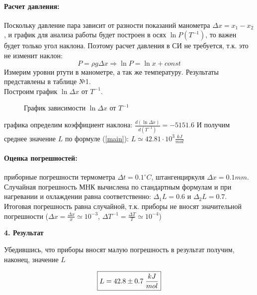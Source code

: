 \documentclass[12pt,a4paper]{article}
\begin{document}
\paragraph{Расчет давления:} Поскольку давление пара зависит от разности показаний манометра $\Delta x = x_{1} -x_{2}$, и график для анализа работы будет построен в осях $\ln P (T^{-1})$, то важен будет только угол наклона. Поэтому расчет давления в СИ не требуется, т.к. это не изменит наклон: \[P = \rho g \Delta x \Rightarrow \ln P = \ln x + const\]
Измерим уровни ртути в манометре, а так же температуру. Результаты представлены в таблице №1.\\
Построим график $\ln \Delta x$ от $T^{-1}$.
\begin{figure}[h]
\centering
{}
\caption{График зависимости $\ln \Delta x$ от $T^{-1}$ \label{plot}}
\end{figure}

 графика определим коэффициент наклона: $\frac{d(\ln \Delta x)}{d(T^{-1})} = -5151.6$ И получим среднее значение $L$ по формуле (\ref{main}): $L \simeq 42.81 \cdot 10^3 \frac{kJ}{mol}$\\

\paragraph{Оценка погрешностей:} приборные погрешности термометра $\Delta t = 0.1^{\circ} C$, штангенциркуля  $\Delta x = 0.1 mm$. Случайная погрешность МНК вычислена по стандартным формулам и при нагревании и охлаждении равна соответственно: $\Delta_{1} L = 0.6$ и $\Delta_{2} L = 0.7$.\\
Итоговая погрешность равна случайной, т.к. приборы не вносят значительной погрешности ($\Delta x = \frac{\Delta x}{x} \simeq 10^{-3}$, $\Delta T^{-1} = \frac{\Delta T}{T}  \simeq 10^{-4}$)\\

\begin{Large}
\begin{center}
\textbf{4. Результат}\\
\end{center}
\end{Large}
Убедившись, что приборы вносят малую погрешность в результат получим, наконец, значение $L$
\begin{Large}
\begin{equation} \label{main2}
\boxed{ L =  42.8 \pm 0.7 \; \frac{kJ}{mol}}\\
\end{equation}
\end{Large}
\end{document}
